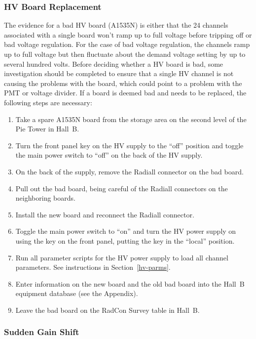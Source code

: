 \documentclass[letterpaper,10pt]{article}
\begin{document}
\subsubsection{HV Board Replacement}
\label{board-swap}

The evidence for a bad HV board (A1535N) is either that the 24 channels associated with a single 
board won't ramp up to full voltage before tripping off or bad voltage regulation. For the case
of bad voltage regulation, the channels ramp up to full voltage but then fluctuate about the demand 
voltage setting by up to several hundred volts. Before deciding whether a HV board is bad, some
investigation should be completed to ensure that a single HV channel is not causing the problems
with the board, which could point to a problem with the PMT or voltage divider. If a board is deemed 
bad and needs to be replaced, the following steps are necessary:

\begin{enumerate}
\item Take a spare A1535N board from the storage area on the second level of the Pie Tower in Hall~B.
\item Turn the front panel key on the HV supply to the ``off'' position and toggle the main power 
switch to ``off'' on the back of the HV supply.
\item On the back of the supply, remove the Radiall connector on the bad board.
\item Pull out the bad board, being careful of the Radiall connectors on the neighboring boards.
\item Install the new board and reconnect the Radiall connector.
\item Toggle the main power switch to ``on'' and turn the HV power supply on using the key on the front 
panel, putting the key in the ``local'' position.
\item Run all parameter scripts for the HV power supply to load all channel parameters. See instructions
in Section~\ref{hv-parms}.
\item Enter information on the new board and the old bad board into the Hall~B equipment database (see
the Appendix).
\item Leave the bad board on the RadCon Survey table in Hall~B.
\end{enumerate}

\subsubsection{Sudden Gain Shift}
\label{gain-shift}
\end{document}
